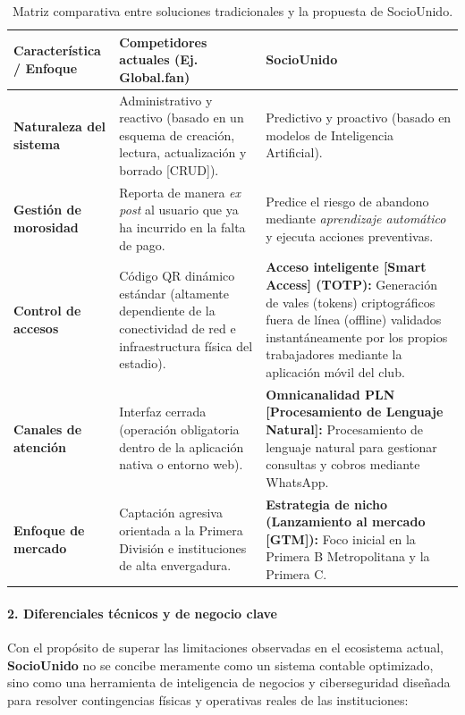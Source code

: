 \begin{table}[h!]
\centering
\renewcommand{\arraystretch}{1.5}
\begin{tabularx}{\textwidth}{|l|X|X|}
\hline
\rowcolor{gray!20} \textbf{Característica / Enfoque} & \textbf{Competidores actuales (Ej. Global.fan)} & \textbf{SocioUnido} \\ \hline
\textbf{Naturaleza del sistema} & Administrativo y reactivo (basado en un esquema de creación, lectura, actualización y borrado [CRUD]). & Predictivo y proactivo (basado en modelos de Inteligencia Artificial). \\ \hline
\textbf{Gestión de morosidad} & Reporta de manera \textit{ex post} al usuario que ya ha incurrido en la falta de pago. & Predice el riesgo de abandono mediante \textit{aprendizaje automático} y ejecuta acciones preventivas. \\ \hline
\textbf{Control de accesos} & Código QR dinámico estándar (altamente dependiente de la conectividad de red e infraestructura física del estadio). & \textbf{Acceso inteligente [Smart Access] (TOTP):} Generación de vales (tokens) criptográficos fuera de línea (offline) validados instantáneamente por los propios trabajadores mediante la aplicación móvil del club. \\ \hline
\textbf{Canales de atención} & Interfaz cerrada (operación obligatoria dentro de la aplicación nativa o entorno web). & \textbf{Omnicanalidad PLN [Procesamiento de Lenguaje Natural]:} Procesamiento de lenguaje natural para gestionar consultas y cobros mediante WhatsApp. \\ \hline
\textbf{Enfoque de mercado} & Captación agresiva orientada a la Primera División e instituciones de alta envergadura. & \textbf{Estrategia de nicho (Lanzamiento al mercado [GTM]):} Foco inicial en la Primera B Metropolitana y la Primera C. \\ \hline
\end{tabularx}
\caption{Matriz comparativa entre soluciones tradicionales y la propuesta de SocioUnido.}
\label{tab:cuadro_comparativo}
\end{table}

\newpage

\paragraph{2. Diferenciales técnicos y de negocio clave}

Con el propósito de superar las limitaciones observadas en el ecosistema actual, \textbf{SocioUnido} no se concibe meramente como un sistema contable optimizado, sino como una herramienta de inteligencia de negocios y ciberseguridad diseñada para resolver contingencias físicas y operativas reales de las instituciones:

